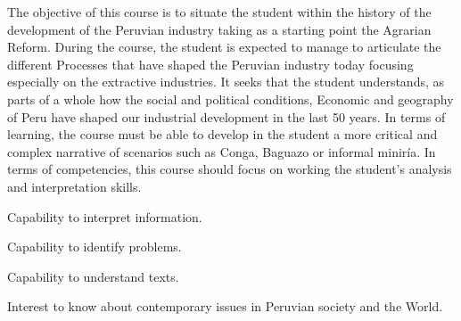 \begin{syllabus}


\begin{justification}
The objective of this course is to situate the student within the history of the development of the Peruvian industry taking as a starting point the Agrarian Reform. During the course, the student is expected to manage to articulate the different
Processes that have shaped the Peruvian industry today focusing especially on the extractive industries. It seeks that the student understands, as parts of a whole how the social and political conditions,
Economic and geography of Peru have shaped our industrial development in the last 50 years. In terms of learning, the course must be able to develop in the student a more critical and complex narrative of scenarios such as Conga, Baguazo or informal miniría. In terms of competencies, this course should focus on working the student's analysis and interpretation skills.
\end{justification}

\begin{goals}
\item Capability to interpret information.
\item Capability to identify problems.
\item Capability to understand texts.
\item Interest to know about contemporary issues in Peruvian society and the World.
\end{goals}

\begin{outcomes}
    \item {} 
    \item {} 
    \item {} 
    \item {} 
    \item {} 
\end{outcomes}

\begin{competences}
    \item {}
    \item {}
    \item {}
    \item {}
\end{competences}


\end{syllabus}
